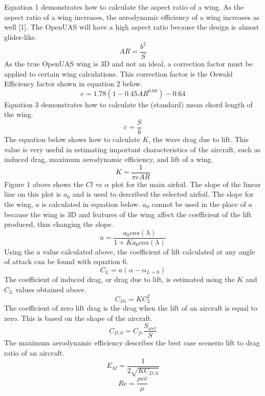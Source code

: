 \documentclass{article}
\begin{document}
Equation 1 demonstrates how to calculate the aspect ratio of a wing. As the aspect ratio of a wing increases, the aerodynamic efficiency of a wing increases as well [1]. The OpenUAS will have a high aspect ratio because the design is almost glider-like. \\
\begin{equation}
AR = \frac{b^2}{S}
\end{equation}
As the true OpenUAS wing is 3D and not an ideal, a correction factor must be applied to certain wing calculations. This correction factor is the Oswald Efficiency factor shown in equation 2 below. \\
\begin{equation}
e =1.78(1-0.45AR^{0.68}) - 0.64
\end{equation}
Equation 3 demonstrates how to calculate the (standard) mean chord length of the wing. 
\begin{equation}
\bar{c} = \frac{S}{b}
\end{equation}
The equation below shows how to calculate $K$, the wave drag due to lift. This value is very useful in estimating important characteristics of the aircraft, such as induced drag, maximum aerodynamic efficiency, and lift of a wing. 
\begin{equation}
K = \frac{1}{\pi eAR}
\end{equation}
Figure 1 above shows the $Cl$ vs $\alpha$ plot for the main airfoil. The slope of the linear line on this plot is $a_0$ and is used to described the selected airfoil. The slope for the wing, $a$ is calculated in equation below. $a_0$ cannot be used in the place of $a$ because the wing is 3D and features of the wing affect the coefficient of the lift produced, thus changing the slope.\\
\begin{equation}
a = \frac{a_0cos(\lambda)}{1+Ka_0cos(\lambda)}
\end{equation}
Using the $a$ value calculated above, the coefficient of lift calculated at any angle of attack can be found with equation 6. \\
\begin{equation}
C_L = a(\alpha - \alpha_{L=0})
\end{equation}
The coefficient of induced drag, or drag due to lift, is estimated using the $K$ and $C_L$ values obtained above. \\
\begin{equation}
C_{Di} = KC_L^2
\end{equation}
The coefficient of zero lift drag is the drag when the lift of an aircraft is equal to zero. This is based on the shape of the aircraft.
\begin{equation}
{C_{D,0}} = C_{fe}\frac{S_{wet}}{S}
\end{equation}
The maximum aerodynamic efficiency describes the best case scenerio lift to drag ratio of an aircraft.
\begin{equation}
E_M = \frac{1}{2\sqrt{KC_{D,0}}}
\end{equation}
\begin{equation}
Re = \frac{\rho v\bar{c}}{\mu}
\end{equation}
\end{document}

